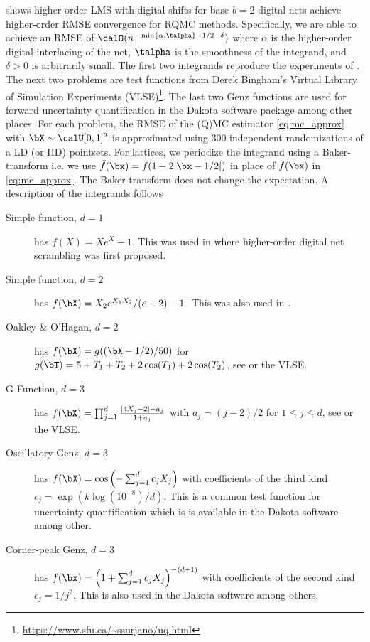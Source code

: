 \documentclass[acmsmall]{acmart}
\begin{document}
 shows higher-order LMS with digital shifts for base $b=2$ digital nets achieve higher-order RMSE convergence for RQMC methods. Specifically, we are able to achieve an RMSE of $\calO(n^{-\min\{\alpha,\talpha\}-1/2-\delta})$ where $\alpha$ is the higher-order digital interlacing of the net, $\talpha$ is the smoothness of the integrand, and $\delta>0$ is arbitrarily small.  The first two integrands reproduce the experiments of \citep{dick.higher_order_scrambled_digital_nets}. The next two problems are test functions from Derek Bingham's Virtual Library of Simulation Experiments (VLSE)\footnote{\label{fn:VLSE}\url{https://www.sfu.ca/~ssurjano/uq.html}}. The last two Genz functions are used for forward uncertainty quantification in the Dakota software package \citep{adams2020dakota} among other places. For each problem, the RMSE of the (Q)MC estimator  \eqref{eq:mc_approx} with $\bX \sim \calU[0,1]^d$ is approximated using $300$ independent randomizations of a LD (or IID) pointsets. For lattices, we periodize the integrand using a Baker-transform i.e. we use $\tilde{f}(\bx) = f(1-2\lvert \bx-1/2\rvert)$ in place of $f(\bx)$ in \eqref{eq:mc_approx}. The Baker-transform does not change the expectation. A description of the integrands follows 
\begin{description}
    \item[Simple function, $d=1$] has $f(X) = X e^X-1$. This was used in \citep{dick.higher_order_scrambled_digital_nets} where higher-order digital net scrambling was first proposed.
    \item[Simple function, $d=2$] has $f(\bX) = X_2 e^{X_1 X_2}/(e-2)-1$. This was also used in \citep{dick.higher_order_scrambled_digital_nets}.
    \item[Oakley \& O'Hagan, $d=2$] has $f(\bX) = g((\bX-1/2)/50)$ for $g(\bT) = 5+T_1+T_2+2\cos(T_1)+2\cos(T_2)$, see \citep{oakley2002bayesian} or the VLSE.
    \item[G-Function, $d=3$] has $f(\bX) = \prod_{j=1}^d \frac{\lvert 4X_j-2\rvert-a_j}{1+a_j}$ with $a_j = (j-2)/2$ for $1 \leq j \leq d$, see  \citep{crestaux2007polynomial,marrel2009calculations} or the VLSE. 
    \item[Oscillatory Genz, $d=3$] has $f(\bX) = \cos\left(-\sum_{j=1}^d c_j X_j \right)$ with coefficients of the third kind $c_j = \exp\left(k \log\left(10^{-8}\right)/d\right)$. This is a common test function for uncertainty quantification which is is available in the Dakota software \citep{adams2020dakota} among other.  
    \item[Corner-peak Genz, $d=3$] has $f(\bx) = \left(1+\sum_{j=1}^d c_j X_j\right)^{-(d+1)}$ with coefficients of the second kind $c_j = 1/j^2$. This is also used in the Dakota software \citep{adams2020dakota} among others. 
\end{description}
\end{document}
